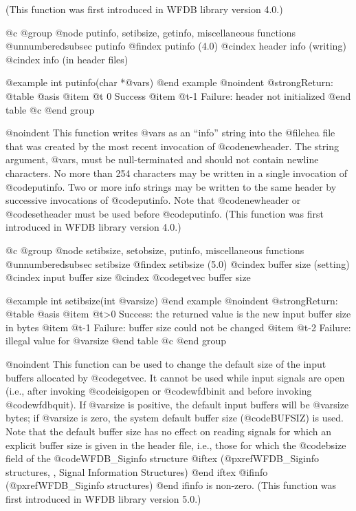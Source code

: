 {{{{{{{{{{(This function was first introduced in WFDB library version 4.0.)

@c @group
@node     putinfo, setibsize, getinfo, miscellaneous functions
@unnumberedsubsec putinfo
@findex putinfo (4.0)
@cindex header info (writing)
@cindex info (in header files)

@example
int putinfo(char *@var{s})
@end example
@noindent
@strong{Return:}
@table @asis
@item @t{ 0}
Success
@item @t{-1}
Failure: header not initialized
@end table
@c @end group

@noindent
This function writes @var{s} as an ``info'' string into the
@file{hea} file that was created by the most recent invocation of
@code{newheader}.  The string argument, @var{s}, must be null-terminated
and should not contain newline characters.  No more than 254 characters
may be written in a single invocation of @code{putinfo}.  Two or more
info strings may be written to the same header by successive
invocations of @code{putinfo}.  Note that @code{newheader} or
@code{setheader} must be used before @code{putinfo}.  (This function was
first introduced in WFDB library version 4.0.)

@c @group
@node     setibsize, setobsize, putinfo, miscellaneous functions
@unnumberedsubsec setibsize
@findex setibsize (5.0)
@cindex buffer size (setting)
@cindex input buffer size
@cindex @code{getvec} buffer size

@example
int setibsize(int @var{size})
@end example
@noindent
@strong{Return:}
@table @asis
@item @t{>0}
Success: the returned value is the new input buffer size in bytes
@item @t{-1}
Failure: buffer size could not be changed
@item @t{-2}
Failure: illegal value for @var{size}
@end table
@c @end group

@noindent
This function can be used to change the default size of the input
buffers allocated by @code{getvec}.  It cannot be used while input
signals are open (i.e., after invoking @code{isigopen} or @code{wfdbinit}
and before invoking @code{wfdbquit}).  If @var{size} is positive, the
default input buffers will be @var{size} bytes;  if @var{size} is zero,
the system default buffer size (@code{BUFSIZ}) is used.  Note that
the default buffer size has no effect on reading signals for which
an explicit buffer size is given in the header file, i.e.,
those for which the @code{bsize} field of the @code{WFDB_Siginfo} structure
@iftex
(@pxref{WFDB_Siginfo structures, , Signal Information Structures})
@end iftex
@ifinfo
(@pxref{WFDB_Siginfo structures})
@end ifinfo
is non-zero.
(This function was first introduced in WFDB library version 5.0.)

}}}}}}}}}}
